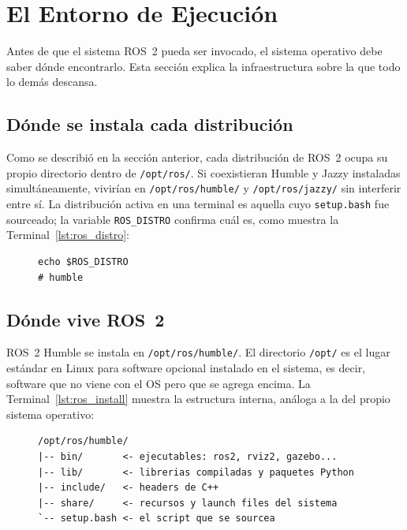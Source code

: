 \section{El Entorno de Ejecución}

Antes de que el sistema ROS~2 pueda ser invocado, el sistema operativo debe saber dónde encontrarlo. Esta sección explica la infraestructura sobre la que todo lo demás descansa.

\subsection{Dónde se instala cada distribución}

Como se describió en la sección anterior, cada distribución de ROS~2 ocupa su propio directorio dentro de \texttt{/opt/ros/}. Si coexistieran Humble y Jazzy instaladas simultáneamente, vivirían en \texttt{/opt/ros/humble/} y \texttt{/opt/ros/jazzy/} sin interferir entre sí. La distribución activa en una terminal es aquella cuyo \texttt{setup.bash} fue sourceado; la variable \texttt{ROS\_DISTRO} confirma cuál es, como muestra la Terminal~\ref{lst:ros_distro}:

\begin{figure}[H]
\centering
\begin{lstlisting}[style=bash, caption={Verificación de la distribución activa.}, label={lst:ros_distro}]
echo $ROS_DISTRO
# humble
\end{lstlisting}
\end{figure}

\subsection{Dónde vive ROS~2}

ROS~2 Humble se instala en \texttt{/opt/ros/humble/}. El directorio \texttt{/opt/} es el lugar estándar en Linux para software opcional instalado en el sistema, es decir, software que no viene con el OS pero que se agrega encima. La Terminal~\ref{lst:ros_install} muestra la estructura interna, análoga a la del propio sistema operativo:

\begin{figure}[H]
\centering
\begin{lstlisting}[style=bash, caption={Estructura de instalación de ROS~2 Humble.}, label={lst:ros_install}]
/opt/ros/humble/
|-- bin/       <- ejecutables: ros2, rviz2, gazebo...
|-- lib/       <- librerias compiladas y paquetes Python
|-- include/   <- headers de C++
|-- share/     <- recursos y launch files del sistema
`-- setup.bash <- el script que se sourcea
\end{lstlisting}
\end{figure}

